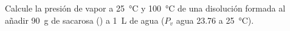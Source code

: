 Calcule la presión de vapor a \SI{25}{\celsius} y \SI{100}{\celsius} de una disolución formada al añadir \SI{90}{\gram} de sacarosa () a \SI{1}{\liter} de agua ($P_v$ agua \SI{23,76}{\torr} a \SI{25}{\celsius}).
